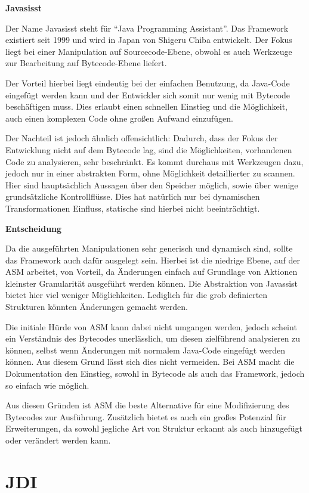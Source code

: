 \textbf{Javasisst}

Der Name Javasisst steht für "`Java Programming Assistant"'. Das Framework existiert seit 1999 und wird in Japan von Shigeru Chiba entwickelt. Der Fokus liegt bei einer Manipulation auf Sourcecode-Ebene, obwohl es auch Werkzeuge zur Bearbeitung auf Bytecode-Ebene liefert.

Der Vorteil hierbei liegt eindeutig bei der einfachen Benutzung, da Java-Code eingefügt werden kann und der Entwickler sich somit nur wenig mit Bytecode beschäftigen muss. Dies erlaubt einen schnellen Einstieg und die Möglichkeit, auch einen komplexen Code ohne großen Aufwand einzufügen.

Der Nachteil ist jedoch ähnlich offensichtlich: Dadurch, dass der Fokus der Entwicklung nicht auf dem Bytecode lag, sind die Möglichkeiten, vorhandenen Code zu analysieren, sehr beschränkt. Es kommt durchaus mit Werkzeugen dazu, jedoch nur in einer abstrakten Form, ohne Möglichkeit detaillierter zu scannen. Hier sind hauptsächlich Aussagen über den Speicher möglich, sowie über wenige grundsätzliche Kontrollflüsse. Dies hat natürlich nur bei dynamischen Transformationen Einfluss, statische sind hierbei nicht beeinträchtigt.

\textbf{Entscheidung}

Da die ausgeführten Manipulationen sehr generisch und dynamisch sind, sollte das Framework auch dafür ausgelegt sein. Hierbei ist die niedrige Ebene, auf der ASM arbeitet, von Vorteil, da Änderungen einfach auf Grundlage von Aktionen kleinster Granularität ausgeführt werden können. Die Abstraktion von Javassist bietet hier viel weniger Möglichkeiten. Lediglich für die grob definierten Strukturen könnten Änderungen gemacht werden.

Die initiale Hürde von ASM kann dabei nicht umgangen werden, jedoch scheint ein Verständnis des Bytecodes unerlässlich, um diesen zielführend analysieren zu können, selbst wenn Änderungen mit normalem Java-Code eingefügt werden können. Aus diesem Grund lässt sich dies nicht vermeiden. Bei ASM macht die Dokumentation den Einstieg, sowohl in Bytecode als auch das Framework, jedoch so einfach wie möglich.

Aus diesen Gründen ist ASM die beste Alternative für eine Modifizierung des Bytecodes zur Ausführung. Zusätzlich bietet es auch ein großes Potenzial für Erweiterungen, da sowohl jegliche Art von Struktur erkannt als auch hinzugefügt oder verändert werden kann.

\section{JDI} 

